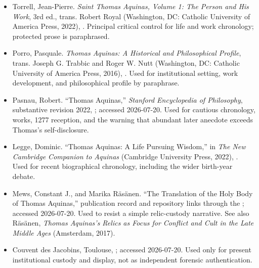 \begin{itemize}
\item Torrell, Jean-Pierre.  \emph{Saint Thomas Aquinas, Volume 1: The Person
and His Work}, 3rd ed., trans. Robert Royal (Washington, DC: Catholic
University of America Press, 2022),
.  Principal critical control for life and work chronology; protected
prose is paraphrased.

\item Porro, Pasquale.  \emph{Thomas Aquinas: A Historical and Philosophical
Profile}, trans. Joseph G. Trabbic and Roger W. Nutt (Washington, DC: Catholic
University of America Press, 2016),
.  Used for institutional setting, work development, and philosophical
profile by paraphrase.

\item Pasnau, Robert.  ``Thomas Aquinas,'' \emph{Stanford Encyclopedia of
Philosophy}, substantive revision 2022,
;
accessed 2026-07-20.  Used for cautious chronology, works, 1277 reception, and
the warning that abundant later anecdote exceeds Thomas's self-disclosure.

\item Legge, Dominic.  ``Thomas Aquinas: A Life Pursuing Wisdom,'' in
\emph{The New Cambridge Companion to Aquinas} (Cambridge University Press,
2022),
.
Used for recent biographical chronology, including the wider birth-year debate.

\item Mews, Constant J., and Marika Räsänen.  ``The Translation of the Holy
Body of Thomas Aquinas,'' publication record and repository links through the
; accessed 2026-07-20.  Used to resist a
simple relic-custody narrative.  See also Räsänen, \emph{Thomas Aquinas's
Relics as Focus for Conflict and Cult in the Late Middle Ages} (Amsterdam,
2017).

\item Couvent des Jacobins, Toulouse,
; accessed
2026-07-20.  Used only for present institutional custody and display, not as
independent forensic authentication.


\end{itemize}
